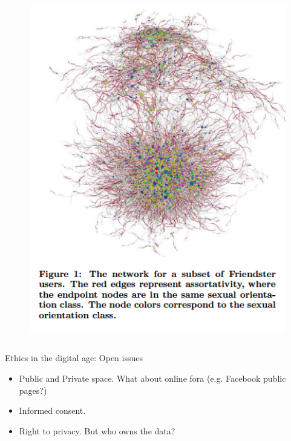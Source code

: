 \documentclass[serif, aspectratio=169]{beamer}
\begin{document}
\begin{frame}
\begin{columns}
\begin{column}{0.35\textwidth}
\begin{figure}
    \includegraphics[width=1\textwidth]{figure/garcia_fig2}
\end{figure}
\end{column}
\end{columns}

\end{frame}

\begin{frame}
{Ethics in the digital age: Open issues}

\begin{itemize}

\item Public and Private space. What about online fora (e.g. Facebook public pages?)

\item Informed consent.

\item Right to privacy. But who owns the data?

\end{itemize}

\end{frame}
\end{document}
